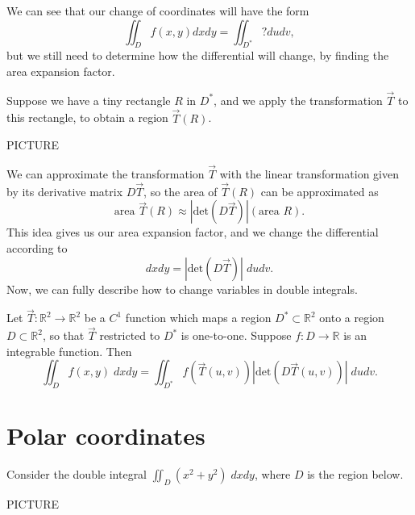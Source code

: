\documentclass{ximera}
\begin{document}
We can see that our change of coordinates will have the form
\[
\iint_D f(x,y)dxdy = \iint_{D^*} ? dudv,
\]
but we still need to determine how the differential will change, by finding the area expansion factor.

Suppose we have a tiny rectangle $R$ in $D^*$, and we apply the transformation $\vec{T}$ to this rectangle, to obtain a region $\vec{T}(R)$.

PICTURE

We can approximate the transformation $\vec{T}$ with the linear transformation given by its derivative matrix $D\vec{T}$, so the area of $\vec{T}(R)$ can be approximated as
\[
\text{area } \vec{T}(R) \approx \left|\text{det}(D\vec{T})\right|(\text{area }R).
\]
This idea gives us our area expansion factor, and we change the differential according to
\[
dxdy = \left|\text{det}(D\vec{T})\right|\;dudv.
\]
Now, we can fully describe how to change variables in double integrals.

\begin{proposition}
Let $\vec{T}:\mathbb{R}^2\rightarrow\mathbb{R}^2$ be a $C^1$ function which maps a region $D^*\subset\mathbb{R}^2$ onto a region $D\subset\mathbb{R}^2$, so that $\vec{T}$ restricted to $D^*$ is one-to-one. Suppose $f:D\rightarrow\mathbb{R}$ is an integrable function. Then
\[
\iint_D f(x,y)\;dxdy = \iint_{D^*} f(\vec{T}(u,v))\left|\text{det}(D\vec{T}(u,v))\right|\;dudv.
\]
\end{proposition}

\section*{Polar coordinates}

Consider the double integral $\iint_D (x^2+y^2)\;dxdy$, where $D$ is the region below.

PICTURE
\end{document}
